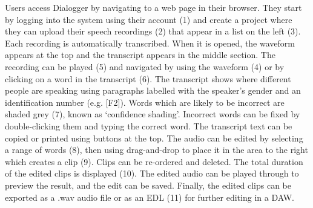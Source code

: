 Users access Dialogger by navigating to a web page in their browser. They start by logging into the system using their
account (1) and create a project where they can upload their speech recordings (2) that appear in a list on the left
(3). Each recording is automatically transcribed. When it is opened, the waveform appears at the top and the transcript
appears in the middle section.  The recording can be played (5) and navigated by using the waveform (4) or by clicking
on a word in the transcript (6). The transcript shows where different people are speaking using paragraphs labelled
with the speaker's gender and an identification number (e.g. [F2]). Words which are likely to be incorrect are shaded
grey (7), known as `confidence shading'.  Incorrect words can be fixed by double-clicking them and typing the correct
word.  The transcript text can be copied or printed using buttons at the top. The audio can be edited by selecting a
range of words (8), then using drag-and-drop to place it in the area to the right which creates a clip (9).  Clips can
be re-ordered and deleted. The total duration of the edited clips is displayed (10). The edited audio can be played
through to preview the result, and the edit can be saved. Finally, the edited clips can be exported as a .wav audio
file or as an EDL (11) for further editing in a DAW.




